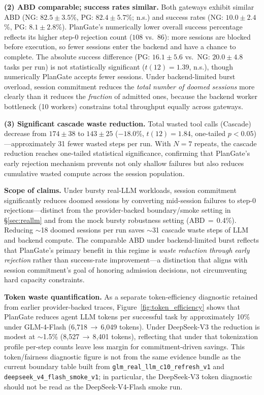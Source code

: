 \documentclass[sigconf,review,anonymous]{acmart}
\begin{document}
\noindent\textbf{(2) ABD comparable; success rates similar.}
Both gateways exhibit similar ABD (NG: $82.5\pm3.5$\%, PG: $82.4\pm5.7$\%; n.s.) and success rates (NG: $10.0\pm2.4$\%, PG: $8.1\pm2.8$\%). PlanGate's numerically lower overall success percentage reflects its higher step-0 rejection count ($108$ vs.\ $86$): more sessions are blocked before execution, so fewer sessions enter the backend and have a chance to complete. The absolute success difference (PG: $16.1\pm5.6$ vs.\ NG: $20.0\pm4.8$ tasks per run) is not statistically significant ($t(12){=}1.39$, n.s.), though numerically PlanGate accepts fewer sessions. Under backend-limited burst overload, session commitment reduces the \emph{total number of doomed sessions} more clearly than it reduces the \emph{fraction} of admitted ones, because the backend worker bottleneck (10 workers) constrains total throughput equally across gateways.

\noindent\textbf{(3) Significant cascade waste reduction.}
Total wasted tool calls (Cascade) decrease from $174\pm38$ to $143\pm25$ ($-18.0$\%, $t(12){=}1.84$, one-tailed $p{<}0.05$)---approximately 31 fewer wasted steps per run. With $N{=}7$ repeats, the cascade reduction reaches one-tailed statistical significance, confirming that PlanGate's early rejection mechanism prevents not only shallow failures but also reduces cumulative wasted compute across the session population.

\textbf{Scope of claims.}
Under bursty real-LLM workloads, session commitment significantly reduces doomed sessions by converting mid-session failures to step-0 rejections---distinct from the provider-backed boundary/smoke setting in \S\ref{sec:reallm} and from the mock bursty robustness setting (ABD$\,{=}\,$0.4\%). Reducing $\sim$18 doomed sessions per run saves $\sim$31 cascade waste steps of LLM and backend compute. The comparable ABD under backend-limited burst reflects that PlanGate's primary benefit in this regime is \emph{waste reduction through early rejection} rather than success-rate improvement---a distinction that aligns with session commitment's goal of honoring admission decisions, not circumventing hard capacity constraints.

\textbf{Token waste quantification.}
As a separate token-efficiency diagnostic retained from earlier provider-backed traces, Figure~\ref{fig:token_efficiency} shows that PlanGate reduces agent LLM tokens per successful task by approximately 10\% under GLM-4-Flash (6{,}718\,$\to$\,6{,}049 tokens). Under DeepSeek-V3 the reduction is modest at $\sim$1.5\% (8{,}527\,$\to$\,8{,}401 tokens), reflecting that under that tokenization profile per-step counts leave less margin for commitment-driven savings. This token/fairness diagnostic figure is not from the same evidence bundle as the current boundary table built from \texttt{glm\_real\_llm\_c10\_refresh\_v1} and \texttt{deepseek\_v4\_flash\_smoke\_v1}; in particular, the DeepSeek-V3 token diagnostic should not be read as the DeepSeek-V4-Flash smoke run.
\end{document}
